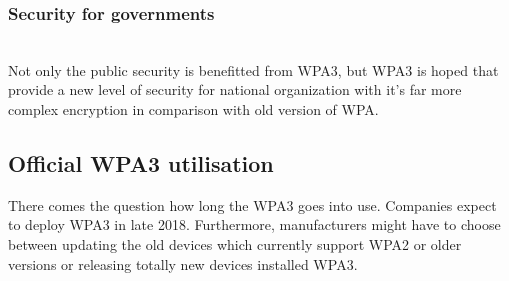 \subsubsection{Security for governments}~\\
Not only the public security is benefitted from WPA3, but WPA3 is hoped that provide a new level of security for national organization with it’s far more complex encryption in comparison with old version of WPA.
\subsection{Official WPA3 utilisation}
There comes the question how long the WPA3 goes into use. Companies expect to deploy WPA3 in late 2018. Furthermore, manufacturers might have to choose between updating the old devices which currently support WPA2 or older versions or releasing totally new devices installed WPA3.